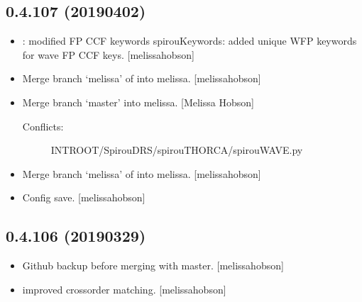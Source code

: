 \documentclass[a4paper,10pt,english]{report}
\begin{document}
\subsection{0.4.107 (2019\sphinxhyphen{}04\sphinxhyphen{}02)}
\label{\detokenize{misc/changelog:id172}}\begin{itemize}
\item {} 
: modified FP CCF keywords spirouKeywords: added unique
WFP keywords for wave FP CCF keys. {[}melissa\sphinxhyphen{}hobson{]}

\item {} 
Merge branch ‘melissa’ of  into
melissa. {[}melissa\sphinxhyphen{}hobson{]}

\item {} 
Merge branch ‘master’ into melissa. {[}Melissa Hobson{]}
\begin{description}
\item[{Conflicts:}] \leavevmode
INTROOT/SpirouDRS/spirouTHORCA/spirouWAVE.py

\end{description}

\item {} 
Merge branch ‘melissa’ of  into
melissa. {[}melissa\sphinxhyphen{}hobson{]}

\item {} 
Config save. {[}melissa\sphinxhyphen{}hobson{]}

\end{itemize}


\subsection{0.4.106 (2019\sphinxhyphen{}03\sphinxhyphen{}29)}
\label{\detokenize{misc/changelog:id173}}\begin{itemize}
\item {} 
Github backup before merging with master. {[}melissa\sphinxhyphen{}hobson{]}

\item {} 
 improved cross\sphinxhyphen{}order matching. {[}melissa\sphinxhyphen{}hobson{]}

\end{itemize}
\end{document}
